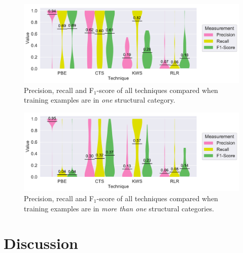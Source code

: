 
\begin{figure}[!t]
	\centering
		\includegraphics[width=\columnwidth, clip]{img/big-study/recall-precision-singlecategory-all.pdf}
		\caption{Precision, recall and F$_{1}$-score of all techniques compared when training examples are in \emph{one} structural category.}
		\label{fig:recall-precision-singlecategory-all}
\end{figure}

\begin{figure}[!t]
		\centering
		\includegraphics[width=\columnwidth, clip]{img/big-study/recall-precision-multicategory-all.pdf}
		\caption{Precision, recall and F$_{1}$-score of all techniques compared when training examples are in \emph{more than one} structural categories.}
		\label{fig:recall-precision-multicategory-all}
\end{figure}


\section{Discussion}
\label{sec:discussion}

